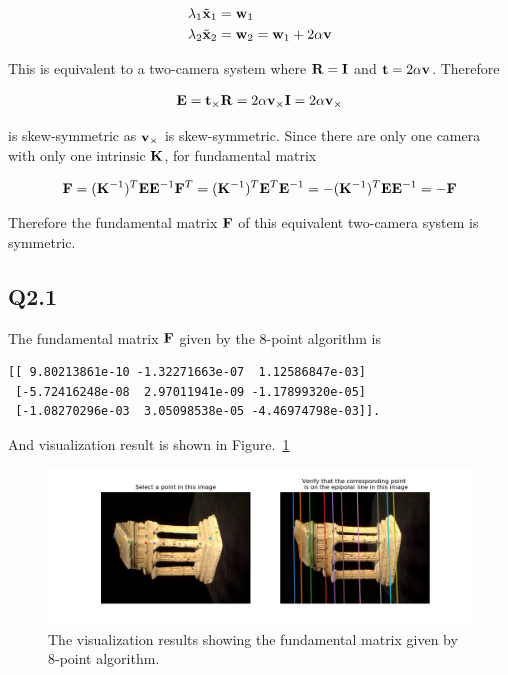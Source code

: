 \documentclass[11pt]{article}
\begin{document}
\begin{align}
  \lambda_1\tilde{\mathbf{x}}_1 &= \mathbf{w}_1 \\
  \lambda_2\tilde{\mathbf{x}}_2 &= \mathbf{w}_2 = \mathbf{w}_1 + 2\alpha\mathbf{v}
\end{align}

This is equivalent to a two-camera system where $\mathbf{R}=\mathbf{I}$ and $\mathbf{t}=2\alpha\mathbf{v}$. Therefore

\begin{align}
  \mathbf{E} = \mathbf{t}_\times \mathbf{R} = 2\alpha\mathbf{v}_\times \mathbf{I}=2\alpha\mathbf{v}_\times
\end{align}

is skew-symmetric as $\mathbf{v}_\times$ is skew-symmetric. Since there are only one camera with only one intrinsic $\mathbf{K}$, for fundamental matrix

\begin{align}
  \mathbf{F} = (\mathbf{K}^{-1})^T \mathbf{E} \mathbf{E}^{-1}
  \mathbf{F}^T = (\mathbf{K}^{-1})^T \mathbf{E}^T \mathbf{E}^{-1} = -(\mathbf{K}^{-1})^T \mathbf{E} \mathbf{E}^{-1} = -\mathbf{F}
\end{align}

Therefore the fundamental matrix $\mathbf{F}$ of this equivalent two-camera system is symmetric.

\newpage

\subsection*{Q2.1}

The fundamental matrix $\mathbf{F}$ given by the 8-point algorithm is

\begin{verbatim}
[[ 9.80213861e-10 -1.32271663e-07  1.12586847e-03]
 [-5.72416248e-08  2.97011941e-09 -1.17899320e-05]
 [-1.08270296e-03  3.05098538e-05 -4.46974798e-03]].
\end{verbatim}

And visualization result is shown in Figure.~\ref{fig:q2.1}

\begin{figure}[h!]
    \centering
    \includegraphics[width=.8\linewidth]{../results/q2_1.png}
    \caption{The visualization results showing the fundamental matrix given by 8-point algorithm. }
    \label{fig:q2.1}
\end{figure}
\end{document}
